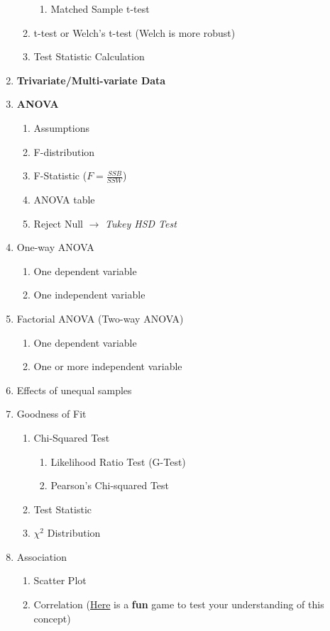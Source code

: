 \documentclass[11pt]{article}
\begin{document}
\begin{enumerate}
\begin{enumerate}
\begin{enumerate}
				\item Matched Sample t-test
			\end{enumerate}
			\item t-test or Welch's t-test (Welch is more robust)
			\item Test Statistic Calculation
		\end{enumerate}
		\item \textbf{Trivariate/Multi-variate Data}
		\item \textbf{ANOVA}
		\begin{enumerate}
			\item Assumptions
			\item F-distribution
			\item F-Statistic ($F = \frac{SSB}{SSW}$)
			\item ANOVA table
			\item Reject Null $\to$ \textit{Tukey HSD Test}
		\end{enumerate}
		\item One-way ANOVA
		\begin{enumerate}
			\item One dependent variable
			\item One independent variable
		\end{enumerate}
		\item Factorial ANOVA (Two-way ANOVA)
		\begin{enumerate}
			\item One dependent variable
			\item One or more independent variable
		\end{enumerate}
		\item Effects of unequal samples
		\item Goodness of Fit
		\begin{enumerate}
			\item Chi-Squared Test
			\begin{enumerate}
				\item Likelihood Ratio Test (G-Test)
				\item Pearson's Chi-squared Test
			\end{enumerate}
			\item Test Statistic
			\item $\chi^2$ Distribution
		\end{enumerate}
		\item Association
		\begin{enumerate}
			\item Scatter Plot
			\item Correlation (\href{http://guessthecorrelation.com/}{Here} is a \textbf{fun} game to test your understanding of this concept)

\end{enumerate}
\end{enumerate}
\end{document}
